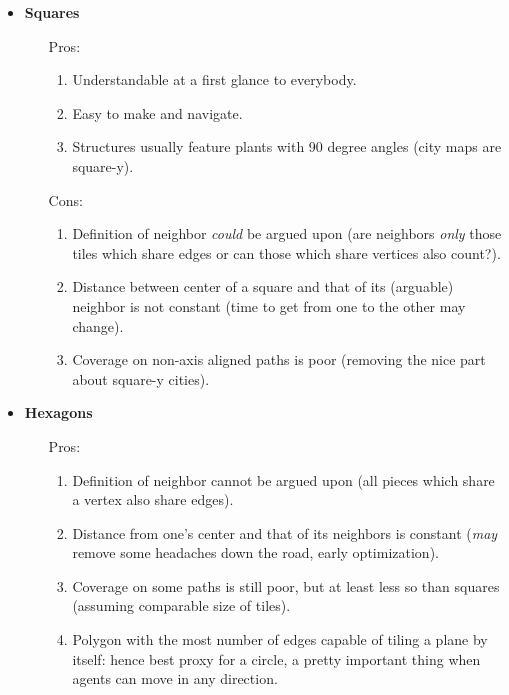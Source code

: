 \documentclass[9pt, a4paper]{IEEEtran}
\begin{document}
    \begin{itemize}
        \item \textbf{Squares}
        \begin{itemize}
            \item[Pros:]
            \begin{enumerate}
                \item Understandable at a first glance to everybody.
                \item Easy to make and navigate.
                \item Structures usually feature plants with 90 degree angles (city maps are square-y).
            \end{enumerate}
            \item[Cons:]
            \begin{enumerate}
                \item Definition of neighbor \emph{could} be argued upon (are neighbors \emph{only} those tiles which share edges or can those which share vertices also count?).
                \item Distance between center of a square and that of its (arguable) neighbor is not constant (time to get from one to the other may change).
                \item Coverage on non-axis aligned paths is poor (removing the nice part about square-y cities).
            \end{enumerate}
        \end{itemize}
        \item \textbf{Hexagons}
        \begin{itemize}
            \item[Pros:]
            \begin{enumerate}
                \item Definition of neighbor cannot be argued upon (all pieces which share a vertex also share edges).
                \item Distance from one's center and that of its neighbors is constant (\emph{may} remove some headaches down the road, early optimization).
                \item Coverage on some paths is still poor, but at least less so than squares (assuming comparable size of tiles).
                \item Polygon with the most number of edges capable of tiling a plane by itself: hence best proxy for a circle, a pretty important thing when agents can move in any direction.

\end{enumerate}
\end{itemize}
\end{itemize}
\end{document}
